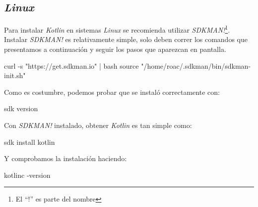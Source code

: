 \subsection{\textit{Linux}}
  Para instalar \textit{Kotlin} en sistemas \textit{Linux} se
  recomienda utilizar \textit{SDKMAN!}\footnote{El \enquote{!} es 
  parte del nombre}.
  Instalar \textit{SDKMAN!} es relativamente simple, solo deben correr
  los comandos que presentamos a continuación y seguir los pasos
  que aparezcan en pantalla.

  \begin{bash}
    curl -s "https://get.sdkman.io" | bash
    source "/home/roac/.sdkman/bin/sdkman-init.sh"
  \end{bash}

  Como es costumbre, podemos probar que se instaló correctamente con:
  \begin{bash}
    sdk version
  \end{bash}

  Con \textit{SDKMAN!} instalado, obtener \textit{Kotlin} es tan simple como:
  \begin{bash}
    sdk install kotlin
  \end{bash}

  Y comprobamos la instalación haciendo:
  \begin{bash}
    kotlinc -version
  \end{bash}